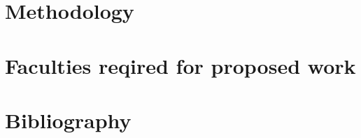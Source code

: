 \documentclass[11pt,a4paper,english]{article}
\begin{document}
\section{Methodology}
\newpage
\section{Faculties reqired for proposed work}
\newpage
\section{Bibliography}


\cite{1}
\end{document}
